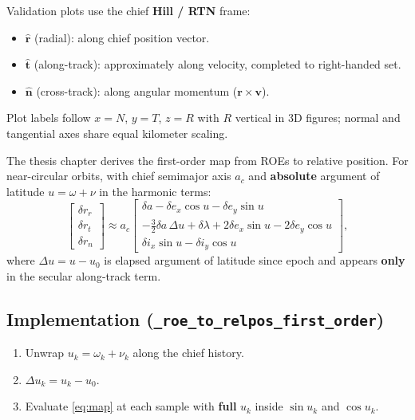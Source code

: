 \documentclass[11pt]{article}
\begin{document}
Validation plots use the chief \textbf{Hill / RTN} frame:
\begin{itemize}
    \item $\hat{\mathbf{r}}$ (radial): along chief position vector.
    \item $\hat{\mathbf{t}}$ (along-track): approximately along velocity, completed to right-handed set.
    \item $\hat{\mathbf{n}}$ (cross-track): along angular momentum ($\mathbf{r}\times\mathbf{v}$).
\end{itemize}

Plot labels follow $x = N$, $y = T$, $z = R$ with $R$ vertical in 3D figures; normal and tangential axes share equal kilometer scaling.

The thesis chapter derives the first-order map from ROEs to relative position. For near-circular orbits, with chief semimajor axis $a_c$ and \textbf{absolute} argument of latitude $u = \omega + \nu$ in the harmonic terms:
\begin{equation}
\begin{bmatrix}
\delta r_r \\ \delta r_t \\ \delta r_n
\end{bmatrix}
\approx a_c
\begin{bmatrix}
\delta a - \delta e_x \cos u - \delta e_y \sin u \\
-\tfrac{3}{2}\delta a\,\Delta u + \delta\lambda + 2\delta e_x \sin u - 2\delta e_y \cos u \\
\delta i_x \sin u - \delta i_y \cos u
\end{bmatrix},
\label{eq:map}
\end{equation}
where $\Delta u = u - u_0$ is elapsed argument of latitude since epoch and appears \textbf{only} in the secular along-track term.

\subsection{Implementation (\texttt{\_roe\_to\_relpos\_first\_order})}

\begin{enumerate}
    \item Unwrap $u_k = \omega_k + \nu_k$ along the chief history.
    \item $\Delta u_k = u_k - u_0$.
    \item Evaluate \eqref{eq:map} at each sample with \textbf{full} $u_k$ inside $\sin u_k$ and $\cos u_k$.
\end{enumerate}
\end{document}
